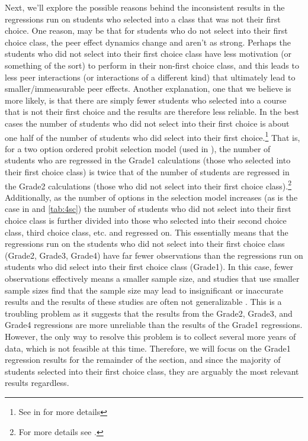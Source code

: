 Next, we'll explore the possible reasons behind the inconsistent results in the regressions run on students who selected into a class that was not their first choice. 
One reason, may be that for students who do not select into their first choice class, the peer effect dynamics change and aren't as strong. 
Perhaps the students who did not select into their first choice class have less motivation (or something of the sort) to perform in their non-first choice class, and this leads to less peer interactions (or interactions of a different kind) that ultimately lead to smaller/immeasurable peer effects. 
Another explanation, one that we believe is more likely, is that there are simply fewer students who selected into a course that is not their first choice and the results are therefore less reliable. 
In the best cases the number of students who did not select into their first choice is about one half of the number of students who did select into their first choice.\footnote{See  in  for more details} 
That is, for a two option ordered probit selection model (used in ), the number of students who are regressed in the Grade1 calculations (those who selected into their first choice class) is twice that of the number of students are regressed in the Grade2 calculations (those who did not select into their first choice class).\footnote{For more details see .} 
Additionally, as the number of options in the selection model increases (as is the case in  and \ref{tab:4sc}) the number of students who did not select into their first choice class is further divided into those who selected into their second choice class, third choice class, etc. and regressed on. 
This essentially means that the regressions run on the students who did not select into their first choice class (Grade2, Grade3, Grade4) have far fewer observations than the regressions run on students who did select into their first choice class (Grade1). 
In this case, fewer observations effectively means a smaller sample size, and studies that use smaller sample sizes find that the sample size may lead to insignificant or inaccurate results \citep{gonzalez2013gibrat} and the results of these studies are often not generalizable \citep{oladipupo2013does}.
This is a troubling problem as it suggests that the results from the Grade2, Grade3, and Grade4 regressions are more unreliable than the results of the Grade1 regressions. 
However, the only way to resolve this problem is to collect several more years of data, which is not feasible at this time. 
Therefore, we will focus on the Grade1 regression results for the remainder of the section, and since the majority of students selected into their first choice class, they are arguably the most relevant results regardless. 

